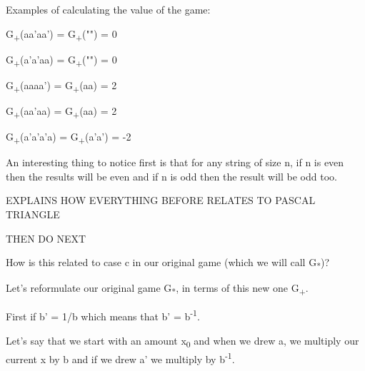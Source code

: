 \documentclass[12pt,reqno]{amsart}
\begin{document}
Examples of calculating the value of the game: 

G\textsubscript{+}(aa'aa') = G\textsubscript{+}("") = 0

G\textsubscript{+}(a'a'aa) = G\textsubscript{+}("") = 0

G\textsubscript{+}(aaaa') = G\textsubscript{+}(aa) =  2

G\textsubscript{+}(aa'aa) = G\textsubscript{+}(aa) = 2

G\textsubscript{+}(a'a'a'a) = G\textsubscript{+}(a'a') = -2

An interesting thing to notice first is that for any string of size n, if n is even then the results will be even and if n is odd then the result will be odd too.

EXPLAINS HOW EVERYTHING BEFORE RELATES TO PASCAL TRIANGLE

THEN DO NEXT


How is this related to case c in our original game (which we will call G\textsubscript{*})?

Let's reformulate our original game G\textsubscript{*},  in terms of this new one G\textsubscript{+}.

First if b' = 1/b which means that b' = b\textsuperscript{-1}.

Let's say that we start with an amount x\textsubscript{0} and when we drew a, we multiply our current x by b and if we drew a' we multiply by b\textsuperscript{-1}.
\end{document}
